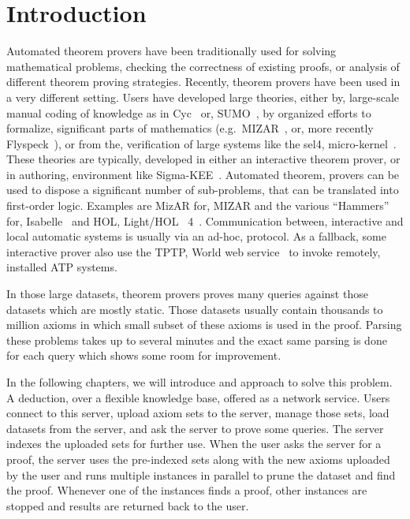 \chapter{Introduction}
\label{chap:intro}

Automated theorem provers have been traditionally used for solving mathematical problems, checking the correctness of existing proofs, or analysis of different theorem proving strategies. Recently, theorem provers have been used in a very different setting. Users have developed large theories, either by, large-scale manual coding of knowledge as in Cyc~\cite{RRG:CO-2005} or, SUMO~\cite{PNL:AAAIWS-2002}, by organized efforts to formalize, significant parts of mathematics (e.g.~MIZAR~\cite{TB:IJCAI-1985}, or, more recently Flyspeck~\cite{HHMNOZ:Kepler-2011}), or from the, verification of large systems like the sel4, micro-kernel~\cite{KE:SOSP-2009}. These theories are typically, developed in either an interactive theorem prover, or in authoring, environment like Sigma-KEE~\cite{PS:IJCAR-2014}. Automated theorem, provers can be used to dispose a significant number of sub-problems, that can be translated into first-order logic. Examples are MizAR for, MIZAR and the various ``Hammers'' for, Isabelle~\cite{MP:JAL-2007,MP:JAR-2009,BN:IJCAR-2010} and HOL, Light/HOL~ 4~\cite{KU:JAR-2014,GK:CPP-2015}. Communication between, interactive and local automatic systems is usually via an ad-hoc, protocol. As a fallback, some interactive prover also use the TPTP, World web service~\cite{Sutcliffe:LPAR-2010} to invoke remotely, installed ATP systems.

In those large datasets, theorem provers proves many queries against those datasets which are mostly static. Those datasets usually contain thousands to million axioms in which small subset of these axioms is used in the proof. Parsing these problems takes up to several minutes and the exact same parsing is done for each query which shows some room for improvement.

In the following chapters, we will introduce and approach to solve this problem. A deduction, over a flexible knowledge base, offered as a network service. Users connect to this server, upload axiom sets to the server, manage those sets, load datasets from the server, and ask the server to prove some queries. The server indexes the uploaded sets for further use. When the user asks the server for a proof, the server uses the pre-indexed sets along with the new axioms uploaded by the user and runs multiple instances in parallel to prune the dataset and find the proof. Whenever one of the instances finds a proof, other instances are stopped and results are returned back to the user.

